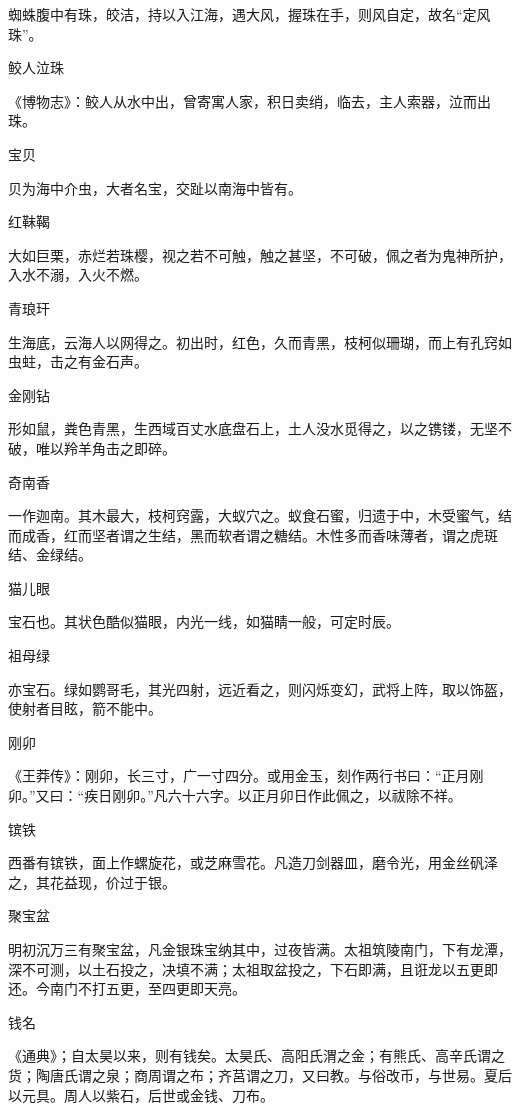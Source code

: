 \documentclass[a4paper,12pt,UTF8,twoside]{ctexbook}
\begin{document}
    蜘蛛腹中有珠，皎洁，持以入江海，遇大风，握珠在手，则风自定，故名“定风珠”。
    
    鲛人泣珠
    
    《博物志》：鲛人从水中出，曾寄寓人家，积日卖绡，临去，主人索器，泣而出珠。
    
    宝贝
    
    贝为海中介虫，大者名宝，交趾以南海中皆有。
    
    红靺鞨
    
    大如巨栗，赤烂若珠樱，视之若不可触，触之甚坚，不可破，佩之者为鬼神所护，入水不溺，入火不燃。
    
    青琅玕
    
    生海底，云海人以网得之。初出时，红色，久而青黑，枝柯似珊瑚，而上有孔窍如虫蛀，击之有金石声。
    
    金刚钻
    
    形如鼠，粪色青黑，生西域百丈水底盘石上，土人没水觅得之，以之镌镂，无坚不破，唯以羚羊角击之即碎。
    
    奇南香
    
    一作迦南。其木最大，枝柯窍露，大蚁穴之。蚁食石蜜，归遗于中，木受蜜气，结而成香，红而坚者谓之生结，黑而软者谓之糖结。木性多而香味薄者，谓之虎斑结、金绿结。
    
    猫儿眼
    
    宝石也。其状色酷似猫眼，内光一线，如猫睛一般，可定时辰。
    
    祖母绿
    
    亦宝石。绿如鹦哥毛，其光四射，远近看之，则闪烁变幻，武将上阵，取以饰盔，使射者目眩，箭不能中。
    
    刚卯
    
    《王莽传》：刚卯，长三寸，广一寸四分。或用金玉，刻作两行书曰：“正月刚卯。”又曰：“疾日刚卯。”凡六十六字。以正月卯日作此佩之，以祓除不祥。
    
    镔铁
    
    西番有镔铁，面上作螺旋花，或芝麻雪花。凡造刀剑器皿，磨令光，用金丝矾泽之，其花益现，价过于银。
    
    聚宝盆
    
    明初沉万三有聚宝盆，凡金银珠宝纳其中，过夜皆满。太祖筑陵南门，下有龙潭，深不可测，以土石投之，决填不满；太祖取盆投之，下石即满，且诳龙以五更即还。今南门不打五更，至四更即天亮。
    
    钱名
    
    《通典》；自太昊以来，则有钱矣。太昊氏、高阳氏渭之金；有熊氏、高辛氏谓之货；陶唐氏谓之泉；商周谓之布；齐莒谓之刀，又曰教。与俗改币，与世易。夏后以元具。周人以紫石，后世或金钱、刀布。
    
\end{document}
